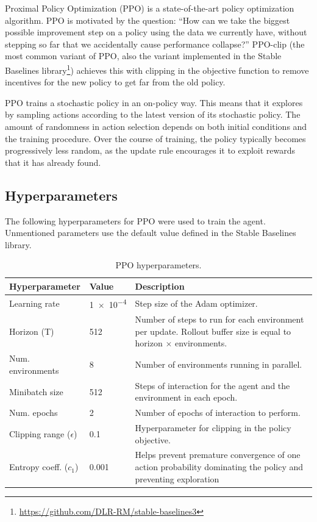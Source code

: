 \documentclass[a4paper]{article}
\begin{document}
Proximal Policy Optimization (PPO) \cite{schulman2017proximal} is a state-of-the-art policy optimization algorithm.
PPO is motivated by the question: ``How can we take the biggest possible improvement step on a policy using the data we currently have, without stepping so far that we accidentally cause performance collapse?''
PPO-clip (the most common variant of PPO, also the variant implemented in the Stable Baselines library\footnote{\url{https://github.com/DLR-RM/stable-baselines3}}) achieves this with clipping in the objective function to remove incentives for the new policy to get far from the old policy.

PPO trains a stochastic policy in an on-policy way.
This means that it explores by sampling actions according to the latest version of its stochastic policy.
The amount of randomness in action selection depends on both initial conditions and the training procedure.
Over the course of training, the policy typically becomes progressively less random, as the update rule encourages it to exploit rewards that it has already found.

\subsection{Hyperparameters}
The following hyperparameters for PPO were used to train the agent.
Unmentioned parameters use the default value defined in the Stable Baselines library.
\begin{table}[htbp]
\centering
\begin{tabularx}{\linewidth}{llX}
\toprule
Hyperparameter & Value & Description \tabularnewline
\midrule
Learning rate & \num{1e-4} & Step size of the Adam optimizer. \tabularnewline
Horizon (T) & 512 & Number of steps to run for each environment per update. Rollout buffer size is equal to horizon $\times$ environments. \tabularnewline
Num. environments & 8 & Number of environments running in parallel. \tabularnewline
Minibatch size & 512 & Steps of interaction for the agent and the environment in each epoch. \tabularnewline
Num. epochs & 2 & Number of epochs of interaction to perform. \tabularnewline
Clipping range ($\epsilon$) & 0.1 & Hyperparameter for clipping in the policy objective. \tabularnewline
Entropy coeff. ($c_1$) & 0.001 & Helps prevent premature convergence of one action probability dominating the policy and preventing exploration \tabularnewline
\bottomrule
\end{tabularx}
\caption{PPO hyperparameters.}
\label{table:hyperparams}
\end{table}
\end{document}
